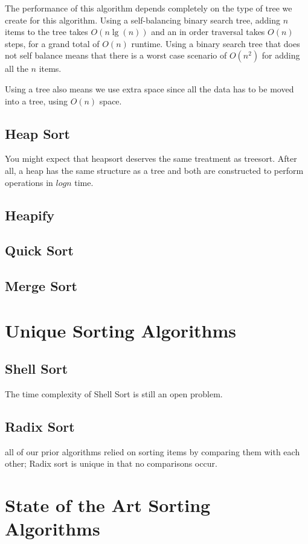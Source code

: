 The performance of this algorithm depends completely on the type of tree we create for this algorithm.  Using a self-balancing binary search tree, adding $ n $ items to the tree takes $ O(n\lg(n)) $ and an in order traversal takes $ O(n) $ steps, for a grand total of $ O(n) $ runtime.  Using a binary search tree that does not self balance means that there is a worst case scenario of $ O(n^{2}) $ for adding all the $ n $ items.

Using a tree also means we use extra space since all the data has to be moved into a tree, using $ O(n) $ space.
\subsection{Heap Sort}
You might expect that heapsort deserves the same treatment as treesort.
After all, a heap has the same structure as a tree and both are constructed to perform operations in $log n $ time.

\subsection{Heapify}

\subsection{Quick Sort}
\subsection{Merge Sort}



\section{Unique Sorting Algorithms}


\subsection{Shell Sort}

The time complexity of Shell Sort is still an open problem.
\subsection{Radix Sort}

all of our prior algorithms relied on sorting items by comparing them with each other;  Radix sort is unique in that no comparisons occur.


\section{State of the Art Sorting Algorithms}

